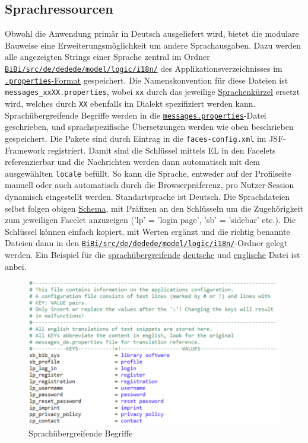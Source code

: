 \documentclass{article}
\begin{document}
\subsection{Sprachressourcen}
\indent Obwohl die Anwendung primär in Deutsch ausgeliefert wird, bietet die modulare Bauweise eine Erweiterungsmöglichkeit um andere Sprachausgaben. Dazu werden alle angezeigten Strings einer Sprache zentral im Ordner \hyperlink{Paketstruktur}{\texttt{BiBi/src/de/dedede/model/logic/i18n/}} des Applikationsverzeichnisses im \hyperlink{https://de.wikipedia.org/wiki/Java-Properties-Datei}{\texttt{.properties}-Format} gespeichert. Die Namenskonvention für diese Dateien ist \texttt{messages\_xxXX.properties}, wobei \texttt{xx} durch das jeweilige \hyperlink{https://de.wikipedia.org/wiki/Liste_der_ISO-639-1-Codes}{Sprachenkürzel} ersetzt wird, welches durch \texttt{XX} ebenfalls im Dialekt spezifiziert werden kann. Sprachübergreifende Begriffe werden in die \hyperlink{messages}{\texttt{messages.properties}}-Datei geschrieben, und sprachspezifische Übersetzungen werden wie oben beschrieben gespeichert. Die Pakete sind durch Eintrag in die \texttt{faces-config.xml} im JSF-Framework registriert. Damit sind die Schlüssel mittels EL in den Facelets referenzierbar und die Nachrichten werden dann automatisch mit dem ausgewählten \texttt{locale} befüllt.  So kann die Sprache, entweder auf der Profilseite manuell oder auch automatisch durch die Browserpräferenz, pro Nutzer-Session dynamisch eingestellt werden. Standartsprache ist Deutsch. Die Sprachdateien selbst folgen obigen \hyperlink{propSchema}{Schema}, mit Präfixen an den Schlüsseln um die Zugehörigkeit zum jeweiligen Facelet anzuzeigen ('lp' = 'login page', 'sb' = 'sidebar' etc.). Die Schlüssel können einfach kopiert, mit Werten ergänzt und die richtig benannte Dateien dann in den \hyperlink{Paketstruktur}{\texttt{BiBi/src/de/dedede/model/logic/i18n/}}-Ordner gelegt werden. Ein Beispiel für die \hyperlink{messages}{sprachübergreifende} \hyperlink{messagesde}{deutsche} und \hyperlink{messagesen}{englische} Datei ist anbei.\\
\newpage
{}
\begin{figure}[H]
\hypertarget{messages}{}
\centering
\includegraphics[width=50em]{messagesen}
\caption{Sprachübergreifende Begriffe}
\end{figure}
\end{document}
